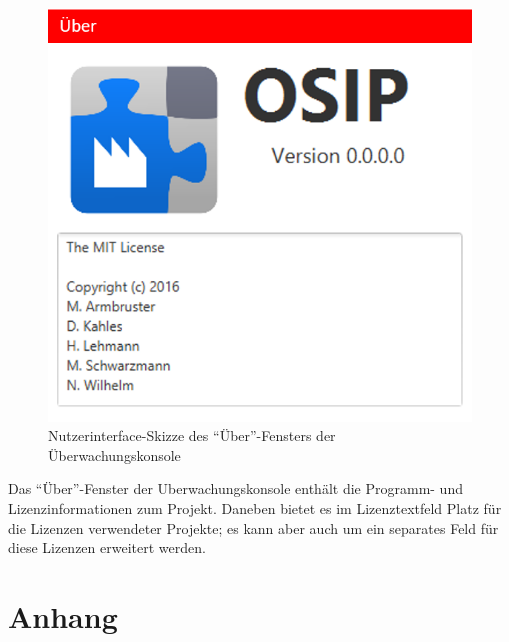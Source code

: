 \documentclass[parskip=full]{scrartcl}
\begin{document}
\begin{figure}[h!]
	\centering
	\includegraphics[scale=0.5]{media/ui-client/ui-uw-uber.png}
	\caption{Nutzerinterface-Skizze des "`Über"'-Fensters der Überwachungskonsole}
\end{figure}
Das "`Über"'-Fenster der \gls{Uberwachungskonsole} enthält die Programm- und Lizenzinformationen zum Projekt. Daneben bietet es im Lizenztextfeld Platz für die Lizenzen verwendeter Projekte; es kann aber auch um ein separates Feld für diese Lizenzen erweitert werden.
\pagebreak

\section{Anhang}
\end{document}
